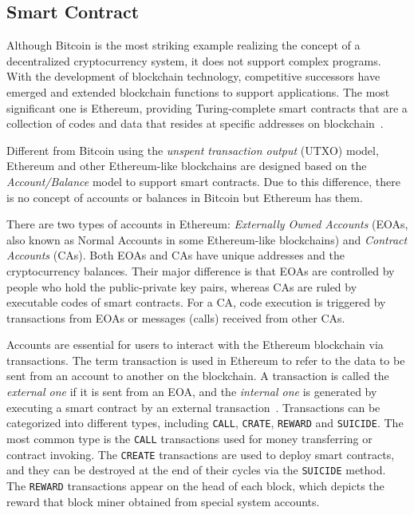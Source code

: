\subsection{Smart Contract}
Although Bitcoin is the most striking example realizing the concept of a decentralized cryptocurrency system, it does not support complex programs. With the development of blockchain technology, competitive successors have emerged and extended blockchain functions to support applications. The most significant one is Ethereum, providing Turing-complete smart contracts that are a collection of codes and data that resides at specific addresses on blockchain~\cite{buterin2013ethereum}.

Different from Bitcoin using the \emph{unspent transaction output} (UTXO) model, Ethereum and other Ethereum-like blockchains are designed based on the \emph{Account/Balance} model to support smart contracts. Due to this difference, there is no concept of accounts or balances in Bitcoin but Ethereum has them.

There are two types of accounts in Ethereum: \emph{Externally Owned Accounts} (EOAs, also known as Normal Accounts in some Ethereum-like blockchains) and \emph{Contract Accounts} (CAs). Both EOAs and CAs have unique addresses and the cryptocurrency balances. Their major difference is that EOAs are controlled by people who hold the public-private key pairs, whereas CAs are ruled by executable codes of smart contracts. For a CA, code execution is triggered by transactions from EOAs or messages (calls) received from other CAs.

Accounts are essential for users to interact with the Ethereum blockchain via transactions. The term transaction is used in Ethereum to refer to the data to be sent from an account to another on the blockchain. A transaction is called the \emph{external one} if it is sent from an EOA, and the \emph{internal one} is generated by executing a smart contract by an external transaction~\cite{chen2018infocom}. Transactions can be categorized into different types, including \texttt{CALL}, \texttt{CRATE}, \texttt{REWARD} and \texttt{SUICIDE}. The most common type is the \texttt{CALL} transactions used for money transferring or contract invoking. The \texttt{CREATE} transactions are used to deploy smart contracts, and they can be destroyed at the end of their cycles via the \texttt{SUICIDE} method. The \texttt{REWARD} transactions appear on the head of each block, which depicts the reward that block miner obtained from special system accounts.

